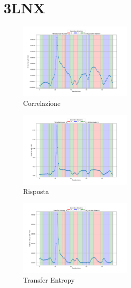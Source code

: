 \documentclass{article}
\begin{document}
\section{3LNX}
\begin{figure}[H]
    \centering
    \includegraphics[width=0.5\textwidth]{"images/3LNXResidual Correlation C_ij for i=22 as a function of j at time index 0.png"}
    \caption{Correlazione}
\end{figure}
\begin{figure}[H]
    \centering
    \includegraphics[width=0.5\textwidth]{"images/3LNXTime Response R_ij for i=22 as a function of j at time index 0.png"}
    \caption{Risposta}
\end{figure}

\begin{figure}[H]
    \centering
    \includegraphics[width=0.5\textwidth]{"images/3LNXTransfer Entropy TE_ij for i=22 as a function of j at time index 0.png"}
    \caption{Transfer Entropy}
\end{figure}
\end{document}
